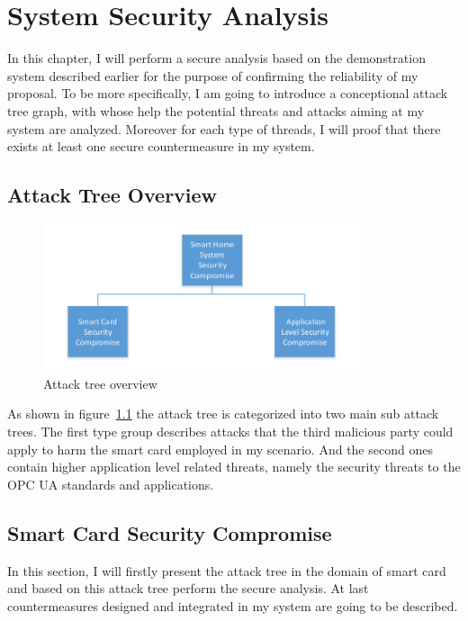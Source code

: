 \chapter{System Security Analysis}
In this chapter, I will perform a secure analysis based on the demonstration system described earlier for the purpose of confirming the reliability of my proposal. To be more specifically, I am going to introduce a conceptional attack tree graph, with whose help the potential threats and attacks aiming at my system are analyzed. Moreover for each type of threads, I will proof that there exists at least one secure countermeasure in my system.

\section{Attack Tree Overview}

 \begin{figure}[!htb]
	\centering
	\includegraphics[width=0.85\textwidth]{attack-tree-overview}
		\caption{Attack tree overview}
	\label{fig:attack-tree-overview}
\end{figure}
As shown in figure~\ref{fig:attack-tree-overview} the attack tree is categorized into two main sub attack  trees. The first type group describes attacks that the third malicious party could apply to harm the smart card employed in my scenario. And the second ones contain higher application level related threats, namely the security threats to the  OPC UA standards and applications. 

\section{Smart Card Security Compromise}
In this section, I will firstly present the attack tree in the domain of smart card and based on this attack tree  perform the secure analysis. At last countermeasures designed and integrated in my system are going to be described.

